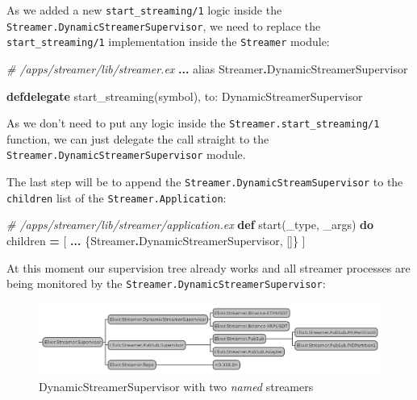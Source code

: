 \documentclass[
]{book}
\newenvironment{Shaded}{\begin{snugshade}}{\end{snugshade}}
\newcommand{\CommentTok}[1]{\textcolor[rgb]{0.56,0.35,0.01}{\textit{#1}}}
\newcommand{\ConstantTok}[1]{\textcolor[rgb]{0.00,0.00,0.00}{#1}}
\newcommand{\ImportTok}[1]{#1}
\newcommand{\KeywordTok}[1]{\textcolor[rgb]{0.13,0.29,0.53}{\textbf{#1}}}
\newcommand{\NormalTok}[1]{#1}
\newcommand{\OperatorTok}[1]{\textcolor[rgb]{0.81,0.36,0.00}{\textbf{#1}}}
\newcommand{\VariableTok}[1]{\textcolor[rgb]{0.00,0.00,0.00}{#1}}
\begin{document}
As we added a new \texttt{start\_streaming/1} logic inside the \texttt{Streamer.DynamicStreamerSupervisor}, we need to replace the \texttt{start\_streaming/1} implementation inside the \texttt{Streamer} module:

\begin{Shaded}
\begin{Highlighting}[]
\CommentTok{\# /apps/streamer/lib/streamer.ex}
  \OperatorTok{...}
  \ImportTok{alias} \ConstantTok{Streamer}\OperatorTok{.}\ConstantTok{DynamicStreamerSupervisor}

  \KeywordTok{defdelegate}\NormalTok{ start\_streaming(symbol), }\VariableTok{to:} \ConstantTok{DynamicStreamerSupervisor}
\end{Highlighting}
\end{Shaded}

As we don't need to put any logic inside the \texttt{Streamer.start\_streaming/1} function, we can just delegate the call straight to the \texttt{Streamer.DynamicStreamerSupervisor} module.

The last step will be to append the \texttt{Streamer.DynamicStreamSupervisor} to the \texttt{children} list of the \texttt{Streamer.Application}:

\begin{Shaded}
\begin{Highlighting}[]
  \CommentTok{\# /apps/streamer/lib/streamer/application.ex}
  \KeywordTok{def}\NormalTok{ start(\_type, \_args) }\KeywordTok{do}
\NormalTok{    children }\OperatorTok{=}\NormalTok{ [}
      \OperatorTok{...}
\NormalTok{      \{}\ConstantTok{Streamer}\OperatorTok{.}\ConstantTok{DynamicStreamerSupervisor}\NormalTok{, []\}}
\NormalTok{    ]}
\end{Highlighting}
\end{Shaded}

At this moment our supervision tree already works and all streamer processes are being monitored by the \texttt{Streamer.DynamicStreamerSupervisor}:

\begin{figure}
\centering
\includegraphics{images/chapter_11_03_first_sup_tree.png}
\caption{DynamicStreamerSupervisor with two \emph{named} streamers}
\end{figure}
\end{document}

